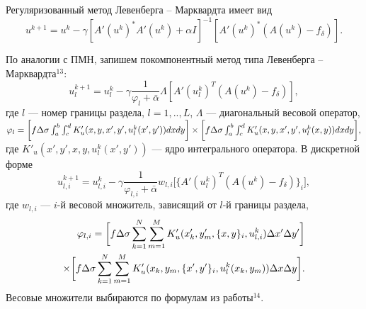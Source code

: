 \documentclass[%
autoref,     %
href,        %
facsimile,   %
colorlinks,  %
]{disser}
\begin{document}
Регуляризованный метод Левенберга -- Марквардта имеет вид 
$$u^{k+1}=u^k-\gamma[A'(u^k)^*A'(u^k)+\alpha I]^{-1} [A'(u^k)^*(A(u^k)-f_\delta)].$$

По аналогии с ПМН, запишем покомпонентный метод типа Левенберга -- Марквардта$^{13}$:
$$ u_l^{k+1}=u_l^k-\gamma\frac{1}{\varphi_l+\bar{\alpha}}\Lambda[ A'(u_l^k)^T(A(u^k)-f_\delta)],$$
где $l$ --- номер границы раздела, $l=1,..,L$, $\Lambda$ --- диагональный весовой оператор, 
$\varphi_l=\bigg[ f\Delta\sigma\int_{a}^{b}\int_{c}^{d}
K'_u(x, y, x', y', u_l^k(x',y'))dxdy\bigg] \notag \\ \times\bigg[f\Delta\sigma\int_{a}^{b}\int_{c}^{d}K'_u(x,y, x',y',u_l^k(x,y))dxdy\bigg], $
где $K'_u(x',y', x, y, u_l^k(x',y'))$ --- ядро интегрального оператора. %
{\scriptsize
\let\thefootnote\relax\let\thefootnote\relax{}}
В дискретной форме
\begin{equation*}\label{comp_lm_meth_disc}
u_{l,i}^{k+1}=u_{l,i}^k-\gamma\frac{1}{\varphi_{l,i}+\bar{\alpha}}w_{l,i}\bigg[ \{A'(u_l^k)^T(A(u^k)-f_\delta)\}_i\bigg],
\end{equation*}
где $w_{l,i}$ --- $i$-й весовой множитель, зависящий от $l$-й границы раздела,
\begin{equation*}
\begin{aligned}
\varphi_{l,i}=\bigg[ f\Delta\sigma\sum\limits_{k=1}^{N}
\sum\limits_{m=1}^{M}
K'_u(x'_k,y'_m, \{x, y\}_i, u_{l,i}^k) \Delta x' \Delta y'\bigg] \notag \\ \times\bigg[f\Delta\sigma\sum\limits_{k=1}^{N}
\sum\limits_{m=1}^{M}K'_u(x_k,y_m, \{x',y'\}_i,u_l^k(x_k,y_m))\Delta x \Delta y\bigg]. 
\end{aligned}
\end{equation*}
{\scriptsize
\let\thefootnote\relax\let\thefootnote\relax{}}
Весовые множители выбираются по формулам из работы$^{14}$. 
\end{document}
